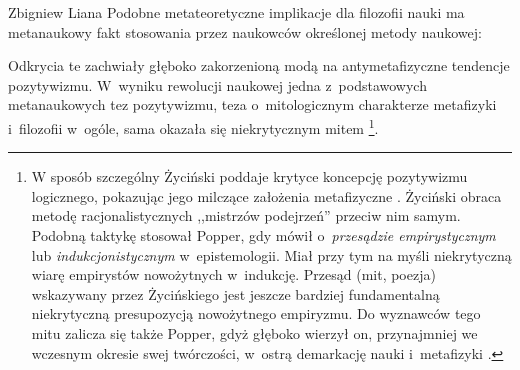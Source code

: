 \begin{artplenv}{Zbigniew Liana}
Podobne metateoretyczne implikacje dla filozofii nauki ma metanaukowy fakt stosowania przez naukowców określonej metody
naukowej: 

Odkrycia te zachwiały głęboko zakorzenioną modą na antymetafizyczne tendencje pozytywizmu. W~wyniku rewolucji naukowej
jedna z~podstawowych metanaukowych tez pozytywizmu, teza o~mitologicznym charakterze metafizyki i~filozofii w~ogóle,
sama okazała się niekrytycznym mitem
\parencite[s.~228]{zycinski_elementy_1996}\footnote{W sposób
szczególny Życiński poddaje krytyce koncepcję pozytywizmu logicznego, pokazując jego milczące założenia metafizyczne
\parencite[s.~246–252]{zycinski_jezyk_1983}.
Życiński obraca metodę racjonalistycznych ,,mistrzów
podejrzeń'' przeciw nim samym. Podobną taktykę stosował Popper, gdy mówił o~\textit{przesądzie empirystycznym} lub
\textit{indukcjonistycznym} w~epistemologii. Miał przy tym na myśli niekrytyczną wiarę empirystów nowożytnych w~indukcję.
Przesąd (mit, poezja) wskazywany przez Życińskiego jest jeszcze bardziej fundamentalną niekrytyczną presupozycją
nowożytnego empiryzmu. Do wyznawców tego mitu zalicza się także Popper, gdyż głęboko wierzył on, przynajmniej we
wczesnym okresie swej twórczości, w~ostrą demarkację nauki i~metafizyki
\parencites[s.~11]{zycinski_structure_1988}[ s.~19n]{zycinski_struktura_2013}[s.~228nn]{zycinski_elementy_1996}.
}.


\end{artplenv}
